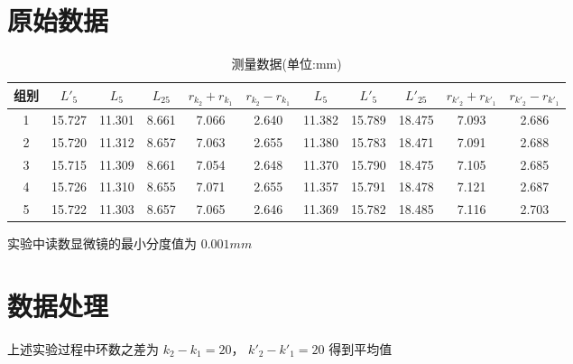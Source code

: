 \documentclass[UTF8]{ctexart}
\begin{document}
\section{原始数据}


\begin{table}[H]
    \caption{测量数据(单位:mm)}
    \begin{tabular}{|c|c|c|c|c|c|c|c|c|c|c|}
    \toprule[1pt]
       组别  &   $L'_5$  & $L_5$  &  $L_{25}$  &  $r_{k_2}+r_{k_1}$ & $r_{k_2}-r_{k_1}$ & $L_5$ & $L'_5$  &$L'_{25}$  & $r_{k'_2} + r_{k'_1} $ & $r_{k'_2} - r_{k'_1} $\\
    \midrule
       1  &  15.727 &11.301  & 8.661  & 7.066  & 2.640  &11.382  & 15.789  & 18.475  & 7.093  & 2.686 \\
    \midrule
       2  & 15.720 &  11.312  & 8.657  & 7.063  & 2.655  &11.380  & 15.783  & 18.471  & 7.091  & 2.688\\
    \midrule
       3  & 15.715 &  11.309  & 8.661  & 7.054  & 2.648  &11.370  & 15.790  & 18.475  & 7.105  & 2.685 \\
    \midrule
       4 & 15.726 &  11.310  & 8.655  & 7.071  & 2.655  &11.357  & 15.791  & 18.478  & 7.121  & 2.687 \\
    \midrule
        5 & 15.722 &  11.303  & 8.657  & 7.065  & 2.646  & 11.369  & 15.782  & 18.485  & 7.116  & 2.703 \\
    \bottomrule[1pt]
    \end{tabular}
\end{table}


实验中读数显微镜的最小分度值为 $0.001mm$



\section{数据处理}

上述实验过程中环数之差为 $k_2 - k_1 = 20$， $k'_2 - k'_1 = 20$
得到平均值 
\end{document}
